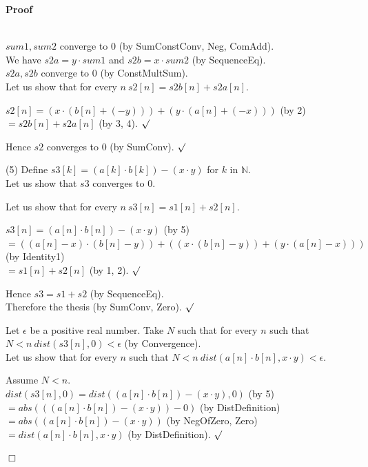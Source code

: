 \documentclass{article}
\newenvironment{forthel}{\begin{leftbar}}{\end{leftbar}}
\newenvironment{proof}{\noindent\textbf{Proof\ }}{\hspace*{\fill}$\Box$\medskip}
\newenvironment{subproof}{\begin{list}{}{}
		\item[\text{Proof}]}{\hfill $\surd$ \end{list}}
\newcommand{\NN}{\mathbb{N}}
\newcommand{\cdottwo}{\cdot}
\newcommand{\plusone}{+}
\newcommand{\dotequal}{=}
\begin{document}
\begin{forthel}
\begin{proof}
\begin{subproof}
	\\$sum1, sum2$ converge to $0$ (by SumConstConv, Neg, ComAdd).
	\\We have $s2a = y \cdottwo sum1$ and $s2b = x \cdottwo sum2$ (by SequenceEq).
	\\$s2a, s2b$ converge to $0$ (by ConstMultSum). 
	\\Let us show that for every $n \ s2[n] = s2b[n] + s2a[n]$.
	\begin{subproof}
	$s2[n] \dotequal (x \cdot (b[n] + (-y))) + (y \cdot (a[n] + (-x)))$ (by 2)
	$\dotequal s2b[n] + s2a[n]$ (by 3, 4).
	\end{subproof}
	Hence $s2$ converges to $0$ (by SumConv).
	\end{subproof}
	(5) Define $s3[k] = (a[k] \cdot b[k]) - (x \cdot y)$ for $k$ in $\NN$.
	\\Let us show that $s3$ converges to $0$.
	\begin{subproof}
	Let us show that for every $n \ s3[n] = s1[n] + s2[n]$.
	\begin{subproof}
	$s3[n] \dotequal (a[n] \cdot b[n]) - (x \cdot y)$ (by 5)
	\\$\dotequal ((a[n] - x) \cdot (b[n] - y)) + ((x \cdot (b[n] - y)) + (y \cdot (a[n] - x)))$ (by Identity1)
	\\$\dotequal s1[n] + s2[n]$ (by 1, 2).
	\end{subproof}
	Hence $s3 = s1 \plusone s2$ (by SequenceEq).
	\\Therefore the thesis (by SumConv, Zero).
	\end{subproof}
	Let $\epsilon$ be a positive real number.
	Take $N$ such that for every $n$ such that $N < n \ dist(s3[n],0) < \epsilon$ (by Convergence).
	\\Let us show that for every $n$ such that $N < n \ dist(a[n] \cdot b[n],x \cdot y) < \epsilon$.
	\begin{subproof}
	Assume $N < n$.
	\\$dist(s3[n],0) \dotequal dist((a[n] \cdot b[n]) - (x \cdot y),0)$ (by 5)
	\\$\dotequal abs(((a[n] \cdot b[n]) - (x \cdot y)) - 0)$ (by DistDefinition)
	\\$\dotequal abs((a[n] \cdot b[n]) - (x \cdot y))$ (by NegOfZero, Zero)
	\\$\dotequal dist(a[n] \cdot b[n],x \cdot y)$ (by DistDefinition).
	\end{subproof}
	\end{proof}


\end{forthel}
\end{document}
